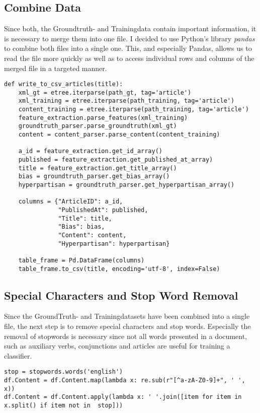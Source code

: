 \documentclass[a4paper, 11pt,titlepage,oneside,openany]{book}
\begin{document}
\subsection{Combine Data}
Since both, the Groundtruth- and Trainingdata contain important information, it is necessary to merge them into one file. I decided to use Python's library \textit{pandas} \cite{pandas} to combine both files into a single one. This, and especially Pandas, allows us to read the file more quickly as well as to access individual rows and columns of the merged file in a targeted manner.
\begin{lstlisting}[caption=Merge GroundTruth- and Training datasets]
def write_to_csv_articles(title):
    xml_gt = etree.iterparse(path_gt, tag='article')
    xml_training = etree.iterparse(path_training, tag='article')
    content_training = etree.iterparse(path_training, tag='article')
    feature_extraction.parse_features(xml_training)
    groundtruth_parser.parse_groundtruth(xml_gt)
    content = content_parser.parse_content(content_training)

    a_id = feature_extraction.get_id_array()
    published = feature_extraction.get_published_at_array)
    title = feature_extraction.get_title_array()
    bias = groundtruth_parser.get_bias_array()
    hyperpartisan = groundtruth_parser.get_hyperpartisan_array()

    columns = {"ArticleID": a_id,
               "PublishedAt": published,
               "Title": title,
               "Bias": bias,
               "Content": content,
               "Hyperpartisan": hyperpartisan}

    table_frame = Pd.DataFrame(columns)
    table_frame.to_csv(title, encoding='utf-8', index=False)
\end{lstlisting}


\subsection{Special Characters and Stop Word Removal}
Since the GroundTruth- and Trainingdatasets have been combined into a single file, the next step  is to remove special characters and stop words. Especially the removal of stopwords is necessary since not all words presented in a document, such as auxiliary verbs, conjunctions and articles \cite{textclassification} are useful for training a classifier.
\begin{lstlisting}[caption=Special Characters and Stop Word Removal]
stop = stopwords.words('english')
df.Content = df.Content.map(lambda x: re.sub(r"[^a-zA-Z0-9]+", ' ', x))
df.Content = df.Content.apply(lambda x: ' '.join([item for item in x.split() if item not in  stop]))
\end{lstlisting}
\end{document}
